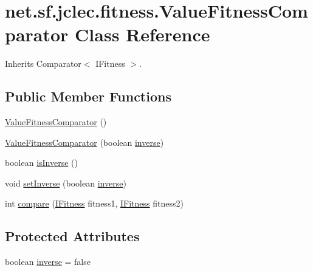 \hypertarget{classnet_1_1sf_1_1jclec_1_1fitness_1_1_value_fitness_comparator}{\section{net.\-sf.\-jclec.\-fitness.\-Value\-Fitness\-Comparator Class Reference}
\label{classnet_1_1sf_1_1jclec_1_1fitness_1_1_value_fitness_comparator}
}


Inherits Comparator$<$ I\-Fitness $>$.

\subsection*{Public Member Functions}
\begin{DoxyCompactItemize}
\item 
\hyperlink{classnet_1_1sf_1_1jclec_1_1fitness_1_1_value_fitness_comparator_ab1bc155cadd5e14b58d03ecdefa73559}{Value\-Fitness\-Comparator} ()
\item 
\hyperlink{classnet_1_1sf_1_1jclec_1_1fitness_1_1_value_fitness_comparator_a110fa792bdb76633bf249501ef9d6ec4}{Value\-Fitness\-Comparator} (boolean \hyperlink{classnet_1_1sf_1_1jclec_1_1fitness_1_1_value_fitness_comparator_a15445e82229518103255b175f9bcd4b7}{inverse})
\item 
boolean \hyperlink{classnet_1_1sf_1_1jclec_1_1fitness_1_1_value_fitness_comparator_a113997ae82fc45384ea7bd1b6a821c39}{is\-Inverse} ()
\item 
void \hyperlink{classnet_1_1sf_1_1jclec_1_1fitness_1_1_value_fitness_comparator_ab089c299b9af036e4e6ab8ed95937f96}{set\-Inverse} (boolean \hyperlink{classnet_1_1sf_1_1jclec_1_1fitness_1_1_value_fitness_comparator_a15445e82229518103255b175f9bcd4b7}{inverse})
\item 
int \hyperlink{classnet_1_1sf_1_1jclec_1_1fitness_1_1_value_fitness_comparator_acb906427f39609d4a4e99b82a4e73271}{compare} (\hyperlink{interfacenet_1_1sf_1_1jclec_1_1_i_fitness}{I\-Fitness} fitness1, \hyperlink{interfacenet_1_1sf_1_1jclec_1_1_i_fitness}{I\-Fitness} fitness2)
\end{DoxyCompactItemize}
\subsection*{Protected Attributes}
\begin{DoxyCompactItemize}
\item 
boolean \hyperlink{classnet_1_1sf_1_1jclec_1_1fitness_1_1_value_fitness_comparator_a15445e82229518103255b175f9bcd4b7}{inverse} = false
\end{DoxyCompactItemize}


